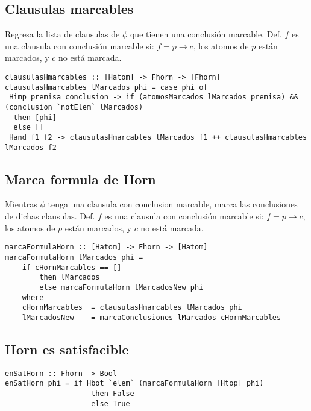 \documentclass[11pt]{article}
\begin{document}
\subsection{Clausulas marcables}
\label{sec:org2cbac5d}
Regresa la lista de clausulas de \(\phi\) que tienen una conclusión marcable.
Def. \(f\) es una clausula con conclusión marcable si: \(f = p \rightarrow c\), los atomos de \(p\) están marcados, y \(c\) no está marcada.
\begin{verbatim}
clausulasHmarcables :: [Hatom] -> Fhorn -> [Fhorn]
clausulasHmarcables lMarcados phi = case phi of
 Himp premisa conclusion -> if (atomosMarcados lMarcados premisa) && 
(conclusion `notElem` lMarcados)
  then [phi]
  else []
 Hand f1 f2 -> clausulasHmarcables lMarcados f1 ++ clausulasHmarcables lMarcados f2
\end{verbatim}
\subsection{Marca formula de Horn}
\label{sec:org97c3066}
Mientras \(\phi\) tenga una clausula con conclusion marcable, marca las conclusiones de dichas clausulas.
Def. \(f\) es una clausula con conclusión marcable si: \(f = p \rightarrow c\), los atomos de \(p\) están marcados, y \(c\) no está marcada.
\begin{verbatim}
marcaFormulaHorn :: [Hatom] -> Fhorn -> [Hatom]
marcaFormulaHorn lMarcados phi = 
    if cHornMarcables == []
        then lMarcados
        else marcaFormulaHorn lMarcadosNew phi
    where
    cHornMarcables  = clausulasHmarcables lMarcados phi
    lMarcadosNew    = marcaConclusiones lMarcados cHornMarcables
\end{verbatim}
\subsection{Horn es satisfacible}
\label{sec:org7ccc68e}
\begin{verbatim}
enSatHorn :: Fhorn -> Bool
enSatHorn phi = if Hbot `elem` (marcaFormulaHorn [Htop] phi)
                    then False
                    else True
\end{verbatim}
\end{document}
